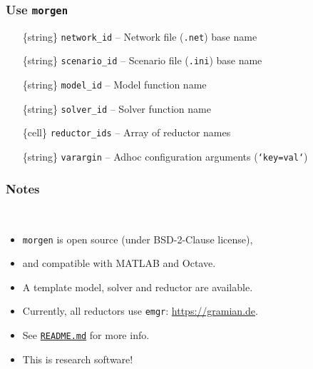 \documentclass[%
aspectratio=43 %
,table %
]{beamer}
\begin{document}

\begin{frame}\frametitle{Use \texttt{morgen}}

\begin{center}
\end{center}

\setlength{\leftmargini}{5em}
\begin{itemize}

 \item[\{string\}] \texttt{network\_id} -- Network file (\texttt{.net}) base name

 \item[\{string\}] \texttt{scenario\_id} -- Scenario file (\texttt{.ini}) base name

 \item[\{string\}] \texttt{model\_id} -- Model function name

 \item[\{string\}] \texttt{solver\_id} -- Solver function name

 \item[\{cell\}] \texttt{reductor\_ids} -- Array of reductor names

 \item[\{string\}] \texttt{varargin} -- Adhoc configuration arguments (\texttt{`key=val`})

\end{itemize}

\end{frame}


\begin{frame}\frametitle{Notes}

\large

~\\

\begin{itemize}

 \item \texttt{morgen} is open source {\normalsize (under BSD-2-Clause license)},

 \item and compatible with MATLAB and Octave.

 \item A template model, solver and reductor are available.

 \item Currently, all reductors use \texttt{emgr}: \alert{\url{https://gramian.de}}.

 \item See \alert{\href{https://github.com/mpimd-csc/morgen/blob/main/README.md}{\texttt{README.md}}} for more info.

 \item This is research software!

\end{itemize}

\end{frame}
\end{document}

